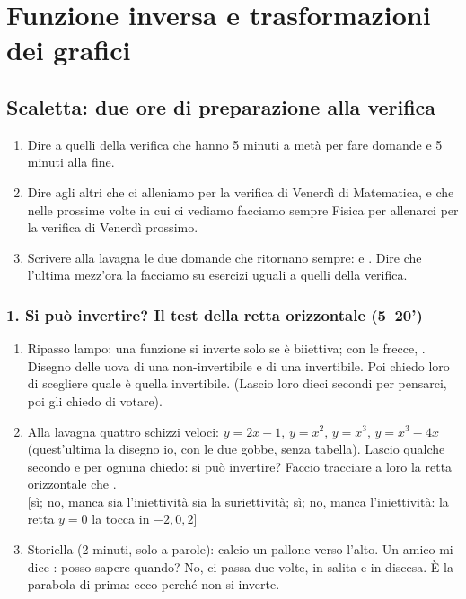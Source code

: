 \documentclass[11pt]{report}
\begin{document}
\tableofcontents

\chapter{Funzione inversa e trasformazioni dei grafici}

\section{Scaletta: due ore di preparazione alla verifica}


\begin{enumerate}
    \item Dire a quelli della verifica che hanno 5 minuti a metà per fare domande e 5 minuti alla fine.
    \item Dire agli altri che ci alleniamo per la verifica di Venerdì di Matematica, e che nelle prossime volte in cui ci vediamo facciamo sempre Fisica per allenarci per la verifica di Venerdì prossimo.
    \item Scrivere alla lavagna le due domande che ritornano sempre:  e . Dire che l'ultima mezz'ora la facciamo su esercizi uguali a quelli della verifica.
\end{enumerate}

\subsection*{1. Si può invertire? Il test della retta orizzontale (5--20')}
\begin{enumerate}
  \item Ripasso lampo: una funzione si inverte solo se è biiettiva; con le frecce, . Disegno delle uova di una non-invertibile e di una invertibile. Poi chiedo loro di scegliere quale è quella invertibile. (Lascio loro dieci secondi per pensarci, poi gli chiedo di votare).
  \item Alla lavagna quattro schizzi veloci: $y=2x-1$, $y=x^2$, $y=x^3$, $y=x^3-4x$ (quest'ultima la disegno io, con le due gobbe, senza tabella). Lascio qualche secondo e per ognuna chiedo: si può invertire? Faccio tracciare a loro la retta orizzontale che .\\
  {}[sì; no, manca sia l'iniettività sia la suriettività; sì; no, manca l'iniettività: la retta $y=0$ la tocca in $-2,0,2$]
  \item Storiella (2 minuti, solo a parole): calcio un pallone verso l'alto. Un amico mi dice : posso sapere quando? No, ci passa due volte, in salita e in discesa. È la parabola di prima: ecco perché non si inverte.
\end{enumerate}
\end{document}
